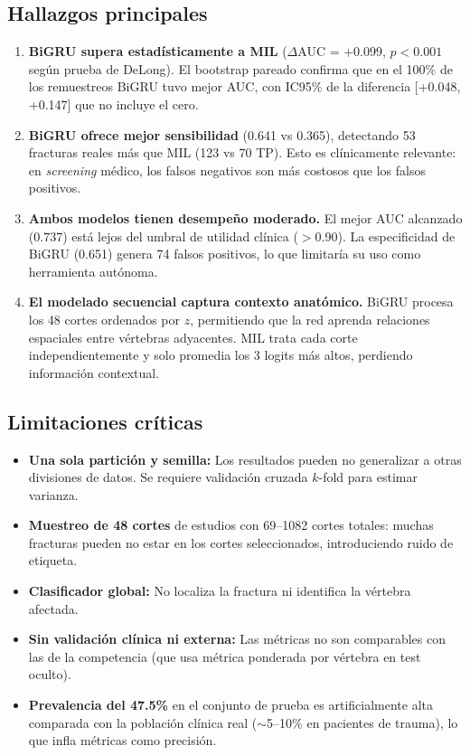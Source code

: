 \subsection*{Hallazgos principales}

\begin{enumerate}[nosep]
\item \textbf{BiGRU supera estad\'isticamente a MIL} ($\Delta$AUC = +0.099, $p < 0.001$ seg\'un prueba de DeLong). El bootstrap pareado confirma que en el 100\% de los remuestreos BiGRU tuvo mejor AUC, con IC95\% de la diferencia [+0.048, +0.147] que no incluye el cero.

\item \textbf{BiGRU ofrece mejor sensibilidad} (0.641 vs 0.365), detectando 53 fracturas reales m\'as que MIL (123 vs 70 TP). Esto es cl\'inicamente relevante: en \emph{screening} m\'edico, los falsos negativos son m\'as costosos que los falsos positivos.

\item \textbf{Ambos modelos tienen desempe\~no moderado.} El mejor AUC alcanzado (0.737) est\'a lejos del umbral de utilidad cl\'inica ($>$0.90). La especificidad de BiGRU (0.651) genera 74 falsos positivos, lo que limitar\'ia su uso como herramienta aut\'onoma.

\item \textbf{El modelado secuencial captura contexto anat\'omico.} BiGRU procesa los 48 cortes ordenados por $z$, permitiendo que la red aprenda relaciones espaciales entre v\'ertebras adyacentes. MIL trata cada corte independientemente y solo promedia los 3 logits m\'as altos, perdiendo informaci\'on contextual.
\end{enumerate}

\subsection*{Limitaciones cr\'iticas}

\begin{itemize}[nosep]
\item \textbf{Una sola partici\'on y semilla:} Los resultados pueden no generalizar a otras divisiones de datos. Se requiere validaci\'on cruzada $k$-fold para estimar varianza.
\item \textbf{Muestreo de 48 cortes} de estudios con 69--1082 cortes totales: muchas fracturas pueden no estar en los cortes seleccionados, introduciendo ruido de etiqueta.
\item \textbf{Clasificador global:} No localiza la fractura ni identifica la v\'ertebra afectada.
\item \textbf{Sin validaci\'on cl\'inica ni externa:} Las m\'etricas no son comparables con las de la competencia (que usa m\'etrica ponderada por v\'ertebra en test oculto).
\item \textbf{Prevalencia del 47.5\%} en el conjunto de prueba es artificialmente alta comparada con la poblaci\'on cl\'inica real ($\sim$5--10\% en pacientes de trauma), lo que infla m\'etricas como precisi\'on.
\end{itemize}

